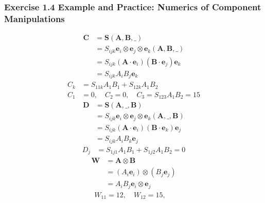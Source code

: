 \documentclass[10pt,a4paper]{article}
\theoremstyle{definition}
\begin{document}
\subsubsection{Exercise 1.4 Example and Practice: Numerics of Component Manipulations}
\begin{align}
    \mathbf{C}
    &=\mathbf{S}(\mathbf{A},\mathbf{B},\_)\\
    &=S_{ijk}\mathbf{e}_i\otimes\mathbf{e}_j\otimes\mathbf{e}_k(\mathbf{A},\mathbf{B},\_)\\
    &=S_{ijk}(\mathbf{A}\cdot\mathbf{e}_i)(\mathbf{B}\cdot\mathbf{e}_j)\mathbf{e}_k\\
    &=S_{ijk}A_iB_j\mathbf{e}_k
\end{align}
\begin{align}
    C_k&=S_{11k}A_1B_1+S_{12k}A_1B_2\\
    C_1&=0,\quad C_2=0,\quad C_3=S_{123}A_1B_2=15
\end{align}
\begin{align}
    \mathbf{D}
    &=\mathbf{S}(\mathbf{A},\_,\mathbf{B})\\
    &=S_{ijk}\mathbf{e}_i\otimes\mathbf{e}_j\otimes\mathbf{e}_k(\mathbf{A},\_,\mathbf{B})\\
    &=S_{ijk}(\mathbf{A}\cdot\mathbf{e}_i)(\mathbf{B}\cdot\mathbf{e}_k)\mathbf{e}_j\\
    &=S_{ijk}A_iB_k\mathbf{e}_j
\end{align}
\begin{align}
    D_j&=S_{1j1}A_1B_1 + S_{1j2}A_1B_2=0
\end{align}
\begin{align}
    \mathbf{W}
    &=\mathbf{A}\otimes\mathbf{B}\\
    &=(A_i\mathbf{e}_i)\otimes(B_j\mathbf{e}_j)\\
    &=A_iB_j \mathbf{e}_i\otimes\mathbf{e}_j
\end{align}
\begin{align}
    W_{11}=12,\quad W_{12}=15,\quad 
\end{align}
\end{document}
